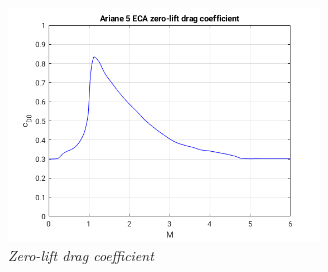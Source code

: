 \documentclass[12pt,fleqn,openany]{book} %
\begin{document}
\begin{figure}[h]
 \centering
 \includegraphics[width=0.735\textwidth]{drag}
 \caption{\emph{Zero-lift drag coefficient}}
 \label{fig:drag}
\end{figure}
\end{document}
